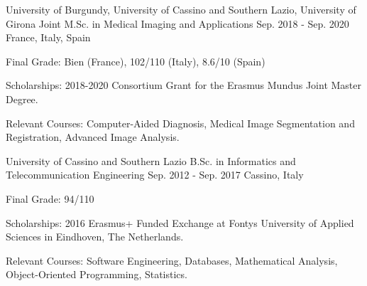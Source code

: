 

\begin{cventries}

  \cventry
    {University of Burgundy, University of Cassino and Southern Lazio, University of Girona} %
    {Joint M.Sc. in Medical Imaging and Applications} %
    {Sep. 2018 - Sep. 2020}
    {France, Italy, Spain}%
    {
      \begin{cvitems} %
        \item {Final Grade: Bien (France), 102/110 (Italy), 8.6/10 (Spain)}
        \item {Scholarships: 2018-2020 Consortium Grant for the Erasmus Mundus Joint Master Degree.}
        \item {Relevant Courses: Computer-Aided Diagnosis, Medical Image Segmentation and Registration, Advanced Image Analysis.}
      \end{cvitems}
    }

  \vspace{2mm}
  \cventry
    {University of Cassino and Southern Lazio} %
    {B.Sc. in Informatics and Telecommunication Engineering} %
    {Sep. 2012 - Sep. 2017} %
    {Cassino, Italy} %
    {
      \begin{cvitems} %
        \item {Final Grade: 94/110}
        \item {Scholarships: 2016 Erasmus+ Funded Exchange at Fontys University of Applied Sciences in Eindhoven, The Netherlands.}
        \item {Relevant Courses: Software Engineering, Databases, Mathematical Analysis, Object-Oriented Programming, Statistics.}
      \end{cvitems}
    }

\end{cventries}
